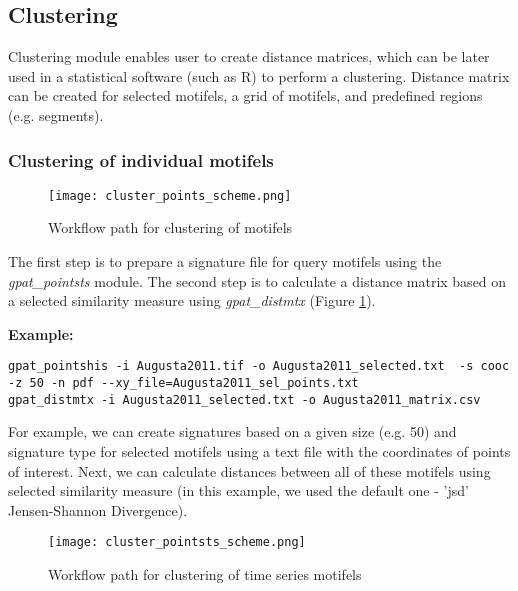 \FloatBarrier

\subsection{Clustering}

Clustering module enables user to create distance matrices, which can be later used in a statistical software (such as R) to perform a clustering.
Distance matrix can be created for selected motifels,
a grid of motifels, and predefined regions (e.g. segments).

\subsubsection{Clustering of individual motifels}

\begin{figure}[H]
	\centering
	\texttt{[image: cluster\_points\_scheme.png]}
	\caption{Workflow path for clustering of motifels}
	\label{FIG:CLUSTER_POINTS}
\end{figure}

The first step is to prepare a signature file for query motifels using the {\it gpat\_pointsts} module. 
The second step is to calculate a distance matrix based on a selected similarity measure using {\it gpat\_distmtx} (Figure \ref{FIG:CLUSTER_POINTS}).

{\bf Example:}

\begin{minipage}{\linewidth}
\begin{lstlisting}
gpat_pointshis -i Augusta2011.tif -o Augusta2011_selected.txt  -s cooc -z 50 -n pdf --xy_file=Augusta2011_sel_points.txt
gpat_distmtx -i Augusta2011_selected.txt -o Augusta2011_matrix.csv
\end{lstlisting}
\end{minipage}

For example, we can create signatures based on a given size (e.g. 50) and signature type for selected motifels using a text file with the coordinates of points of interest.
Next, we can calculate distances between all of these motifels using selected similarity measure (in this example, we used the default one - 'jsd' Jensen-Shannon Divergence).

\begin{figure}[H]
	\centering
	\texttt{[image: cluster\_pointsts\_scheme.png]}
	\caption{Workflow path for clustering of time series motifels}
	\label{FIG:CLUSTER_POINTSTS}
\end{figure}


